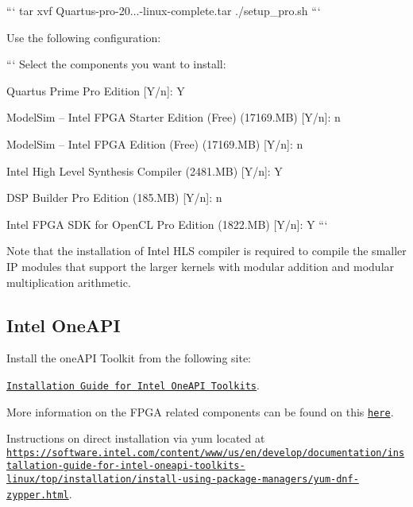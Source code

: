 ``` tar xvf Quartus-\/pro-\/20...-\/linux-\/complete.\-tar ./setup\-\_\-pro.sh ```

Use the following configuration\-:\par


``` Select the components you want to install\-:

Quartus Prime Pro Edition \mbox{[}Y/n\mbox{]}\-: Y

Model\-Sim -- Intel F\-P\-G\-A Starter Edition (Free) (17169.\-M\-B) \mbox{[}Y/n\mbox{]}\-: n

Model\-Sim -- Intel F\-P\-G\-A Edition (Free) (17169.\-M\-B) \mbox{[}Y/n\mbox{]}\-: n

Intel High Level Synthesis Compiler (2481.\-M\-B) \mbox{[}Y/n\mbox{]}\-: Y

D\-S\-P Builder Pro Edition (185.\-M\-B) \mbox{[}Y/n\mbox{]}\-: n

Intel F\-P\-G\-A S\-D\-K for Open\-C\-L Pro Edition (1822.\-M\-B) \mbox{[}Y/n\mbox{]}\-: Y ```

Note that the installation of Intel H\-L\-S compiler is required to compile the smaller I\-P modules that support the larger kernels with modular addition and modular multiplication arithmetic.\par


\subsection*{Intel One\-A\-P\-I}

Install the one\-A\-P\-I Toolkit from the following site\-: \par


\href{https://software.intel.com/content/www/us/en/develop/articles/installation-guide-for-intel-oneapi-toolkits.html}{\tt Installation Guide for Intel One\-A\-P\-I Toolkits}.\par


More information on the F\-P\-G\-A related components can be found on this \href{https://software.intel.com/content/www/us/en/develop/tools/oneapi/components/fpga.html#gs.6nbq2b}{\tt here}. \par


Instructions on direct installation via yum located at \href{https://software.intel.com/content/www/us/en/develop/documentation/installation-guide-for-intel-oneapi-toolkits-linux/top/installation/install-using-package-managers/yum-dnf-zypper.html}{\tt https\-://software.\-intel.\-com/content/www/us/en/develop/documentation/installation-\/guide-\/for-\/intel-\/oneapi-\/toolkits-\/linux/top/installation/install-\/using-\/package-\/managers/yum-\/dnf-\/zypper.\-html}. \par


